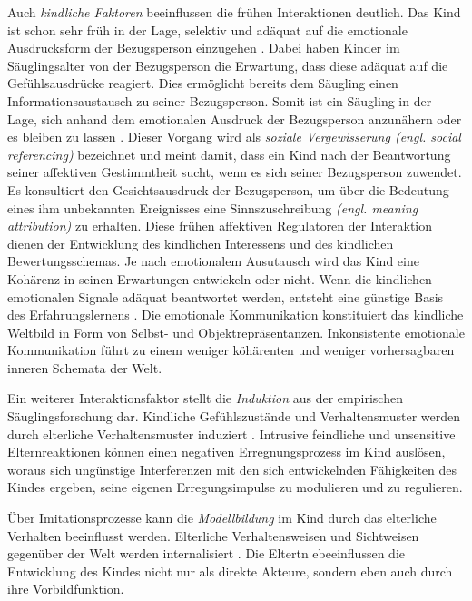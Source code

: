 Auch \textit{kindliche Faktoren} beeinflussen die frühen Interaktionen deutlich. Das Kind ist schon sehr früh in der Lage, selektiv und adäquat auf die emotionale Ausdrucksform der Bezugsperson einzugehen \cite{Harris1994}. Dabei haben Kinder im Säuglingsalter von der Bezugsperson die Erwartung, dass diese adäquat auf die Gefühlsausdrücke reagiert. Dies ermöglicht bereits dem Säugling einen Informationsaustausch zu seiner Bezugsperson. Somit ist ein Säugling in der Lage, sich anhand dem emotionalen Ausdruck der Bezugsperson anzunähern oder es bleiben zu lassen \cite{Resch1999}. Dieser Vorgang wird als \textit{soziale Vergewisserung (engl. social referencing)} bezeichnet und meint damit, dass ein Kind nach der Beantwortung seiner affektiven Gestimmtheit sucht, wenn es sich seiner Bezugsperson zuwendet. Es konsultiert den Gesichtsausdruck der Bezugsperson, um über die Bedeutung eines ihm unbekannten Ereignisses eine Sinnszuschreibung \textit{(engl. meaning attribution)} zu erhalten. Diese frühen affektiven Regulatoren der Interaktion dienen der Entwicklung des kindlichen Interessens und des kindlichen Bewertungsschemas. Je nach emotionalem Ausutausch wird das Kind eine Kohärenz in seinen Erwartungen entwickeln oder nicht. Wenn die kindlichen emotionalen Signale adäquat beantwortet werden, entsteht eine günstige Basis des Erfahrungslernens \cite[S.~95]{Resch1999}. Die emotionale Kommunikation konstituiert das kindliche Weltbild in Form von Selbst- und Objektrepräsentanzen. Inkonsistente emotionale Kommunikation führt zu einem weniger köhärenten und weniger vorhersagbaren inneren Schemata der Welt. 

Ein weiterer Interaktionsfaktor stellt die \textit{Induktion} aus der empirischen Säuglingsforschung dar. Kindliche Gefühlszustände und Verhaltensmuster werden durch elterliche Verhaltensmuster induziert \cite{Cummings1994}. Intrusive feindliche und unsensitive Elternreaktionen können einen negativen Erregnungsprozess im Kind auslösen, woraus sich ungünstige Interferenzen mit den sich entwickelnden Fähigkeiten des Kindes ergeben, seine eigenen Erregungsimpulse zu modulieren und zu regulieren.  

Über Imitationsprozesse kann die \textit{Modellbildung} im Kind durch das elterliche Verhalten beeinflusst werden. Elterliche Verhaltensweisen und Sichtweisen gegenüber der Welt werden internalisiert \cite{Resch1999}. Die Eltertn ebeeinflussen die Entwicklung des Kindes nicht nur als direkte Akteure, sondern eben auch durch ihre Vorbildfunktion. 

